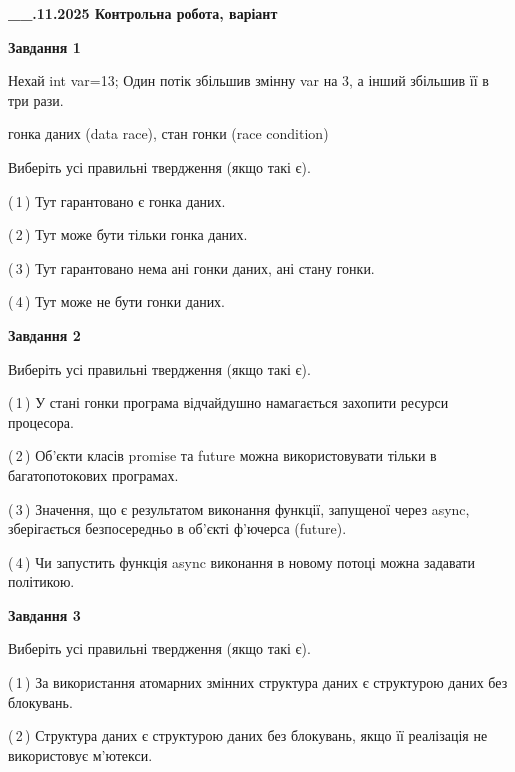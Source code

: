 \documentclass[12pt, ukrainian]{article}
\begin{document}
\begin {large}

\textbf{\_\_.11.2025 Контрольна робота, варіант  }\par


{

\begin{center}
\textbf{Завдання 1}
\end{center}
Нехай int var=13; Один потік збільшив змінну var на 3, а інший збільшив її в три рази.

гонка даних (data race), стан гонки (race condition)

Виберіть усі правильні твердження (якщо такі є).\par
\vspace{2mm}
(\,1\,) Тут гарантовано є гонка даних.%

(\,2\,) Тут може бути тільки гонка даних.%

(\,3\,) Тут гарантовано нема ані гонки даних, ані стану гонки.%

(\,4\,) Тут може не бути гонки даних.%



\begin{center}
\textbf{Завдання 2}
\end{center}
Виберіть усі правильні твердження (якщо такі є).\par
\vspace{2mm}

(\,1\,) У стані гонки програма відчайдушно намагається захопити ресурси процесора.%

(\,2\,) Об’єкти класів promise та future можна використовувати тільки в багатопотокових програмах.%

(\,3\,) Значення, що є результатом виконання функції, запущеної через async, зберігається безпосередньо в об’єкті ф’ючерса (future).%

(\,4\,) Чи запустить функція  async виконання в новому потоці можна задавати політикою.%



\begin{center}
\textbf{Завдання 3}
\end{center}
Виберіть усі правильні твердження (якщо такі є).\par
\vspace{2mm}

(\,1\,) За використання атомарних змінних структура даних є структурою даних без блокувань.%

(\,2\,) Структура даних є структурою даних без блокувань, якщо її реалізація не використовує м’ютекси.%

}
\end{large}
\end{document}
